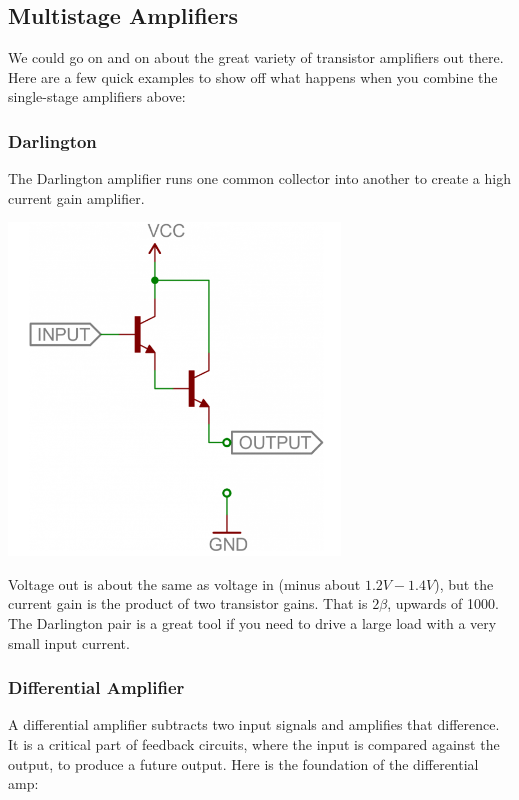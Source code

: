 \documentclass[a4paper, 11pt]{article} %
\begin{document}
\subsection*{Multistage Amplifiers}

We could go on and on about the great variety of transistor amplifiers out there. Here are a few quick examples to show off what happens when you combine the single-stage amplifiers above:

\subsubsection*{Darlington}

The Darlington amplifier runs one common collector into another to create a high current gain amplifier.

\begin{center}
\includegraphics[width=250pt]{tran27}
\end{center}

Voltage out is about the same as voltage in (minus about $1.2V-1.4V$), but the current gain is the product of two transistor gains. That is $2\beta$, upwards of 1000.\\

The Darlington pair is a great tool if you need to drive a large load with a very small input current.

\subsubsection*{Differential Amplifier}

A differential amplifier subtracts two input signals and amplifies that difference. It is a critical part of feedback circuits, where the input is compared against the output, to produce a future output. Here is the foundation of the differential amp:
\end{document}

